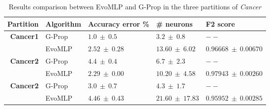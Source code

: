 \documentclass[conference]{IEEEtran}\usepackage[]{graphicx}\usepackage[]{color}
\begin{document}
\begin{table*}
    \centering
    \caption{
        Results comparison between {\sf EvoMLP} and G-Prop in the three partitions of \emph{Cancer}
    }
    \label{tab:gprop-deepgprop-cancer}
    \begin{tabular}{rllll}
        \textbf{Partition} & \textbf{Algorithm} & \textbf{Accuracy error \%} & \textbf{\# neurons}      & \textbf{F2 score}           \\
        \hline
        \textbf{Cancer1}   & G-Prop         & $1.0\ \pm\ 0.5$        & $3.2\ \pm\ 0.8$     & $--$                    \\
                       & {\sf EvoMLP}      & $2.52\ \pm\ 0.28$      & $13.60\ \pm\ 6.02$  & $0.96668\ \pm\ 0.00670$ \\
        \textbf{Cancer2}   & G-Prop         & $4.4\ \pm\ 0.4$        & $6.7\ \pm\ 2.3$     & $--$                    \\
                       & {\sf EvoMLP}      & $2.29\ \pm\ 0.00$      & $10.20\ \pm\ 4.58$  & $0.97943\ \pm\ 0.00260$ \\
        \textbf{Cancer2}   & G-Prop         & $3.0\ \pm\ 0.7$        & $4.3\ \pm\ 1.7$     & $--$                    \\
                       & {\sf EvoMLP}      & $4.46\ \pm\ 0.43$      & $21.60\ \pm\ 17.83$ & $0.95952\ \pm\ 0.00285$ \\
    \end{tabular}
\end{table*}

\end{document}

